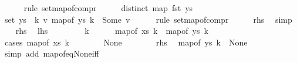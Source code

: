 \begin{isabellebody}
\ \ \ \ \isamarkupfalse%
\ {\isacharparenleft}{\kern0pt}rule\ set{\isacharunderscore}{\kern0pt}map{\isacharunderscore}{\kern0pt}of{\isacharunderscore}{\kern0pt}compr{\isacharparenright}{\kern0pt}\isanewline
\ \ \isamarkupfalse%
\ \isamarkupfalse%
\ {\isacartoucheopen}distinct\ {\isacharparenleft}{\kern0pt}map\ fst\ ys{\isacharparenright}{\kern0pt}{\isacartoucheclose}\ \isamarkupfalse%
\ {\isachardoublequoteopen}set\ ys\ {\isacharequal}{\kern0pt}\ {\isacharbraceleft}{\kern0pt}{\isacharparenleft}{\kern0pt}k{\isacharcomma}{\kern0pt}\ v{\isacharparenright}{\kern0pt}{\isachardot}{\kern0pt}\ map{\isacharunderscore}{\kern0pt}of\ ys\ k\ {\isacharequal}{\kern0pt}\ Some\ v{\isacharbraceright}{\kern0pt}{\isachardoublequoteclose}\isanewline
\ \ \ \ \isamarkupfalse%
\ {\isacharparenleft}{\kern0pt}rule\ set{\isacharunderscore}{\kern0pt}map{\isacharunderscore}{\kern0pt}of{\isacharunderscore}{\kern0pt}compr{\isacharparenright}{\kern0pt}\isanewline
\ \ \isamarkupfalse%
\ \isamarkupfalse%
\ {\isacharquery}{\kern0pt}rhs\ \isamarkupfalse%
\ simp\isanewline
{}\isamarkupfalse%
\isanewline
\ \ \isamarkupfalse%
\ {\isacharquery}{\kern0pt}rhs\ \isamarkupfalse%
\ {\isacharquery}{\kern0pt}lhs\isanewline
\ \ \isamarkupfalse%
\isanewline
\ \ \ \ \isamarkupfalse%
\ k\isanewline
\ \ \ \ \isamarkupfalse%
\ {\isachardoublequoteopen}map{\isacharunderscore}{\kern0pt}of\ xs\ k\ {\isacharequal}{\kern0pt}\ map{\isacharunderscore}{\kern0pt}of\ ys\ k{\isachardoublequoteclose}\isanewline
\ \ \ \ \isamarkupfalse%
\ {\isacharparenleft}{\kern0pt}cases\ {\isachardoublequoteopen}map{\isacharunderscore}{\kern0pt}of\ xs\ k{\isachardoublequoteclose}{\isacharparenright}{\kern0pt}\isanewline
\ \ \ \ \ \ \isamarkupfalse%
\ None\isanewline
\ \ \ \ \ \ \isamarkupfalse%
\ {\isacartoucheopen}{\isacharquery}{\kern0pt}rhs{\isacartoucheclose}\ \isamarkupfalse%
\ {\isachardoublequoteopen}map{\isacharunderscore}{\kern0pt}of\ ys\ k\ {\isacharequal}{\kern0pt}\ None{\isachardoublequoteclose}\isanewline
\ \ \ \ \ \ \ \ \isamarkupfalse%
\ {\isacharparenleft}{\kern0pt}simp\ add{\isacharcolon}{\kern0pt}\ map{\isacharunderscore}{\kern0pt}of{\isacharunderscore}{\kern0pt}eq{\isacharunderscore}{\kern0pt}None{\isacharunderscore}{\kern0pt}iff{\isacharparenright}{\kern0pt}\isanewline
\ \ \ \ \ \ \isamarkupfalse%

\end{isabellebody}
